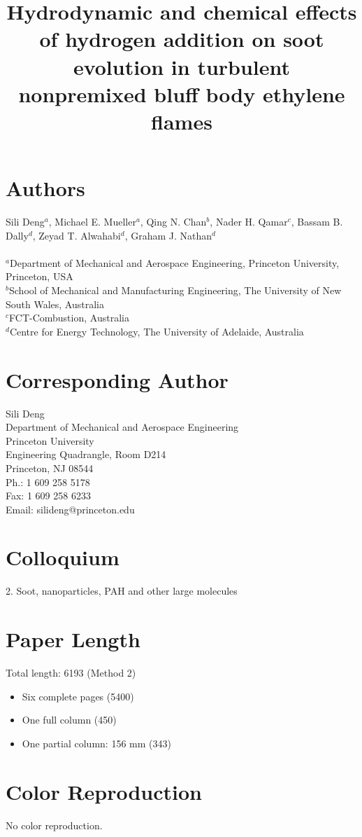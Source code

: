 \documentclass{article}
\title{Hydrodynamic and chemical effects of hydrogen addition on soot evolution in turbulent nonpremixed bluff body ethylene flames}
\date{}
\begin{document}
\maketitle

\section*{Authors}
Sili Deng$^a$, Michael E. Mueller$^a$, Qing N. Chan$^b$, Nader H. Qamar$^c$, Bassam B. Dally$^d$, Zeyad T. Alwahabi$^d$, Graham J. Nathan$^d$\\ \\
$^a$Department of Mechanical and Aerospace Engineering, Princeton University,
Princeton, USA\\
$^b$School of Mechanical and Manufacturing Engineering, The University of New South Wales, Australia\\
$^c$FCT-Combustion, Australia\\ 
$^d$Centre for Energy Technology, The University of Adelaide, Australia

\section*{Corresponding Author}
Sili Deng\\
Department of Mechanical and Aerospace Engineering\\
Princeton University\\
Engineering Quadrangle, Room D214\\
Princeton, NJ 08544\\
Ph.: 1 609 258 5178\\
Fax: 1 609 258 6233\\
Email: silideng@princeton.edu

\section*{Colloquium}
2. Soot, nanoparticles, PAH and other large molecules

\section*{Paper Length}
Total length: 6193 (Method 2)
\begin{itemize}
  \item Six complete pages (5400)
  \item One full column (450)
  \item One partial column: 156 mm (343)
\end{itemize}

\section*{Color Reproduction}
No color reproduction.
\end{document}
